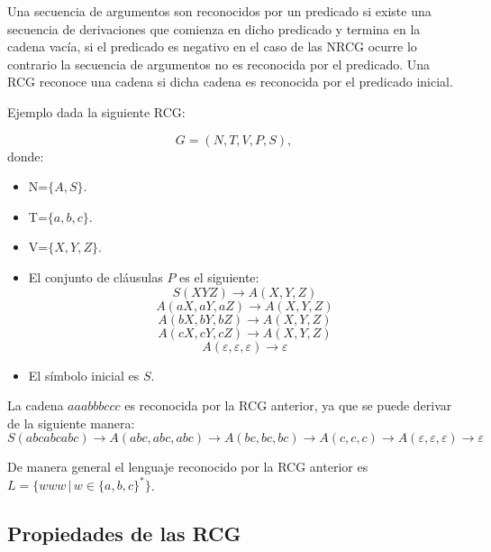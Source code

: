 \documentclass{article}
\begin{document}
Una secuencia de argumentos son reconocidos por un predicado si existe una secuencia de derivaciones que comienza
en dicho predicado y termina en la cadena vacía, si el predicado es negativo en el caso de las NRCG ocurre lo contrario
la secuencia de argumentos no es reconocida por el predicado. Una RCG reconoce una cadena si dicha cadena es reconocida
por el predicado inicial.

Ejemplo dada la siguiente RCG:

\[
      G = (N, T, V, P, S),
\]
donde:

\begin{itemize}
      \item  N=$\{A,S\}$.
      \item T=$\{a,b,c\}$.
      \item V=$\{X,Y,Z\}$.
      \item El conjunto de cláusulas $P$ es el siguiente:
            $$S(XYZ)\to A(X,Y,Z)$$
            $$A(aX,aY,aZ)\to A(X,Y,Z)$$
            $$A(bX,bY,bZ)\to A(X,Y,Z)$$
            $$A(cX,cY,cZ)\to A(X,Y,Z)$$
            $$A(\varepsilon,\varepsilon,\varepsilon)\to \varepsilon$$
      \item El símbolo inicial es $S$.
\end{itemize}
La cadena $aaabbbccc$ es reconocida por la RCG anterior, ya que se puede derivar de la siguiente manera:
$$S(abcabcabc)\to A(abc,abc,abc)\to A(bc,bc,bc)\to A(c,c,c)\to A(\varepsilon,\varepsilon,\varepsilon)\to \varepsilon$$

De manera general el lenguaje reconocido por la RCG anterior es $L=\{www\,|\,w\in \{a,b,c\}^*\}$.

\subsection{Propiedades de las RCG}
\end{document}
